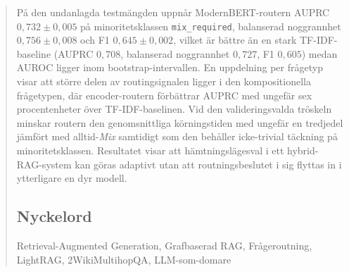 \documentclass[english, bibtex]{kththesis}               %
\newcommand*{\generalExpl}[1]{\todo[inline]{#1}}
\newcommand*{\engExpl}[1]{\todo[inline, backgroundcolor=kth-lightgreen40]{#1}} %
\newcommand*{\warningExpl}[1]{\todo[inline, backgroundcolor=kth-lightred40]{#1}} %
\renewcommand\warningExpl[1]{}
\renewcommand\generalExpl[1]{}
\renewcommand\engExpl[1]{}
\numberwithin{listing}{chapter}
\begin{document}
\begin{abstract}
\begin{scontents}[store-env=abstracts,print-env=true]
På den undanlagda testmängden uppnår ModernBERT-routern AUPRC $0{,}732 \pm 0{,}005$ på minoritetsklassen \texttt{mix\_required}, balanserad noggrannhet $0{,}756 \pm 0{,}008$ och F1 $0{,}645 \pm 0{,}002$, vilket är bättre än en stark TF-IDF-baseline (AUPRC $0{,}708$, balanserad noggrannhet $0{,}727$, F1 $0{,}605$) medan AUROC ligger inom bootstrap-intervallen. En uppdelning per frågetyp visar att större delen av routingsignalen ligger i den kompositionella frågetypen, där encoder-routern förbättrar AUPRC med ungefär sex procentenheter över TF-IDF-baselinen. Vid den validerings\-valda tröskeln minskar routern den genomsnittliga körningstiden med ungefär en tredjedel jämfört med alltid-\emph{Mix} samtidigt som den behåller icke-trivial täckning på minoritetsklassen. Resultatet visar att hämtningslägesval i ett hybrid-RAG-system kan göras adaptivt utan att routningsbeslutet i sig flyttas in i ytterligare en dyr modell.
\end{scontents}

\subsection*{Nyckelord}
\begin{scontents}[store-env=keywords,print-env=true]
Retrieval-Augmented Generation, Grafbaserad RAG, Frågeroutning, LightRAG, 2WikiMultihopQA, LLM-som-domare
\end{scontents}
\end{abstract}
\cleardoublepage
{}


\engExpl{If you add the class option \texttt{includeExtraAbstracts} in your \texttt{docuemntclass}, then you can enable abstracts/summaries in a number of languages. Include those versions of abstracts that you need.}
\generalExpl{If you are an exchange student, use the relevant language or languages for abstracts for your home university, as this will often avoid the need for writing another thesis for your home university.}
\generalExpl{If you are fluent in other languages, feel free to add the abstracts in one or more of them.}

\engExpl{The set of languages that can be easily included are based on those languages that were used in theses at KTH in the period 2018-2019, along with several others that have been used in theses since.}
\warningExpl{Note that you may need to augment the set of languages used in \texttt{polyglossia} or
\texttt{babel} (see the file \texttt{kththesis.cls}). If you add a new language, when specifying the language for the abstract, use the three-letter ISO 639-2 Code – specifically the "B" (bibliographic) variant of these codes (note that this is the same language code used in DiVA).}
\end{document}
